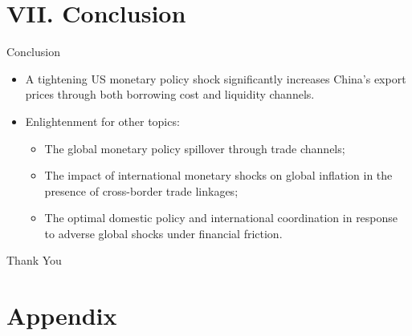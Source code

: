 \documentclass[10pt]{beamer}
\begin{document}






\section{VII. Conclusion}

\begin{frame}{Conclusion}

\begin{itemize}

\item A tightening US monetary policy shock significantly increases China's export prices through both borrowing cost and liquidity channels.
\medskip
\item Enlightenment for other topics:
    \begin{itemize}
        \item The global monetary policy spillover through trade channels;
        \item The impact of international monetary shocks on global inflation in the presence of cross-border trade linkages;
        \item The optimal domestic policy and international coordination in response to adverse global shocks under financial friction.
    \end{itemize}
\end{itemize}

\end{frame}



\begin{frame}{}
  \centering \Huge
   Thank You
\end{frame}


\section*{Appendix}
\end{document}
